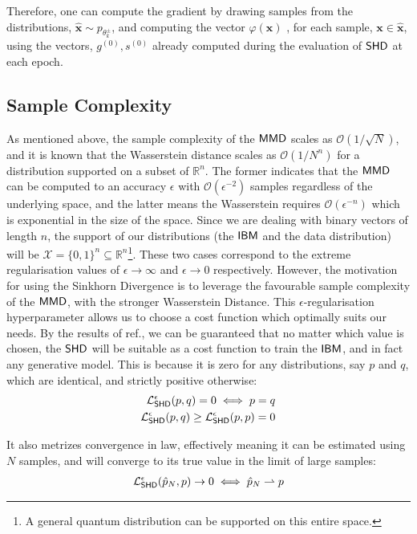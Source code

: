  Therefore, one can compute the gradient by drawing samples from the distributions, $\hat{\mathbf{x}} \sim p_{\theta_k^\pm}$, and computing the vector $\varphi(\mathbf{x})$ , for each sample, $\mathbf{x} \in \hat{\mathbf{x}}$, using the vectors, $g^{(0)}, s^{(0)}$ already computed during the evaluation of $\operatorname{\textsf{SHD}}$ at each epoch.

\subsection{Sample Complexity} \label{supp_matt:sinkhorn_sample_complexity}

As mentioned above, the sample complexity of the $\operatorname{\textsf{MMD}}$ scales as $\mathcal{O}(1/\sqrt{N})$, and it is known that the Wasserstein distance scales as $\mathcal{O}(1/N^n)$  for a distribution supported on a subset of $\mathbb{R}^n$. The former indicates that the $\operatorname{\textsf{MMD}}$ can be computed to an accuracy $\epsilon$ with $\mathcal{O}(\epsilon^{-2})$ samples regardless of the underlying space, and the latter means the Wasserstein requires $\mathcal{O}(\epsilon^{-n})$ which is exponential in the size of the space. Since we are dealing with binary vectors of length $n$, the support of our distributions (the $\textsf{IBM}$ and the data distribution) will be $\mathcal{X} = \{0, 1\}^n \subseteq \mathbb{R}^n$\footnote{A general quantum distribution can be supported on this entire space.}. These two cases correspond to the extreme regularisation values of $\epsilon \rightarrow \infty$ and $\epsilon \rightarrow 0$ respectively. However, the motivation for using the Sinkhorn Divergence is to leverage the favourable sample complexity of the $\operatorname{\textsf{MMD}}$, with the stronger Wasserstein Distance. This $\epsilon$-regularisation hyperparameter allows us to choose a cost function which optimally suits our needs. By the results of ref., we can be guaranteed that no matter which value is chosen, the $\operatorname{\textsf{SHD}}$ will be suitable as a cost function to train the $\textsf{IBM}$, and in fact any generative model. This is because it is zero for any distributions, say $p$ and $q$, which are identical, and strictly positive otherwise:
\begin{align}
    \mathcal{L}_{\operatorname{\textsf{SHD}}}^\epsilon(p, q)  = 0 \iff p = q \label{sinkhornzeroiff}\\
    \mathcal{L}_{\operatorname{\textsf{SHD}}}^\epsilon(p, q) \geq \mathcal{L}_{\operatorname{\textsf{SHD}}}^\epsilon(p, p) = 0 \label{sinkhorngreaterzero_supp}
\end{align}


It also metrizes convergence in law, effectively meaning it can be estimated using $N$ samples, and will converge to its true value in the limit of large samples:
\begin{align}
    \mathcal{L}_{\operatorname{\textsf{SHD}}}^\epsilon(\hat{p}_N, p) \rightarrow 0 \iff \hat{p}_N \rightharpoonup p \label{sinkhornconvergenceinlaw_supp}
 \end{align}
 
